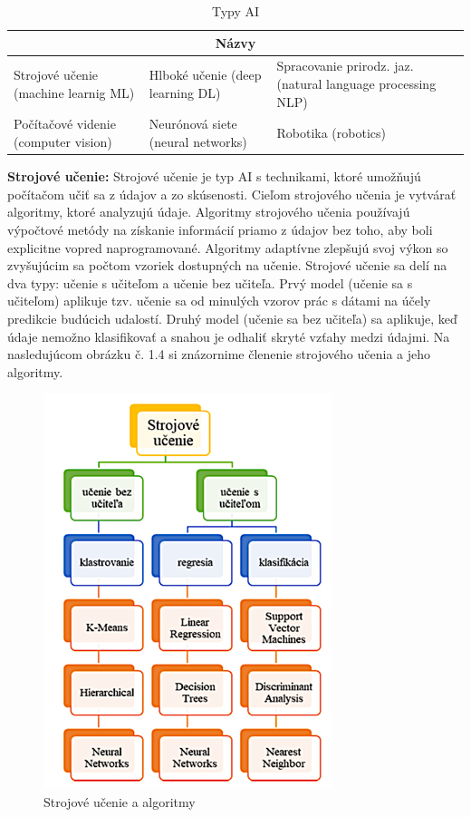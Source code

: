\begin{table}[!ht]
    \centering
    \begin{tabular}{|p{4.1cm}|p{4.1cm}|p{4.1cm}|}
    \hline
       \multicolumn{3}{|c|}{Názvy} \\ \hline
        Strojové učenie (machine learnig ML) & Hlboké učenie (deep learning DL) & Spracovanie prirodz. jaz. (natural language processing NLP)    \\ \hline
        Počítačové videnie (computer vision)  & Neurónová siete (neural networks)  & Robotika (robotics)   \\ \hline
    \end{tabular}
    \caption{\label{table2}Typy AI}
\end{table}

\textbf{Strojové učenie:} Strojové učenie je typ AI s technikami, ktoré umožňujú počítačom učiť sa z údajov a zo skúsenosti. Cieľom strojového učenia je vytvárať algoritmy, ktoré analyzujú údaje. Algoritmy strojového učenia používajú výpočtové metódy na získanie informácií priamo z údajov bez toho, aby boli explicitne vopred naprogramované.  Algoritmy adaptívne zlepšujú svoj výkon so zvyšujúcim sa počtom vzoriek dostupných na učenie.  
Strojové učenie sa delí na dva typy: učenie s učiteľom a učenie bez učiteľa. Prvý model (učenie sa s učiteľom) aplikuje tzv. učenie sa od minulých vzorov prác s dátami na účely predikcie budúcich udalostí.  Druhý model (učenie sa bez učiteľa) sa aplikuje, keď údaje nemožno klasifikovať a snahou je odhaliť skryté vzťahy medzi údajmi. \cite{stalmachova}
Na nasledujúcom obrázku č. 1.4 si znázornime členenie strojového učenia a jeho algoritmy.
\\

\begin{figure}[!ht]
    \centering
    \includegraphics[width=.60\textwidth]{figures/strojove-ucenie.png}
    \caption{Strojové učenie a algoritmy}
\end{figure}

